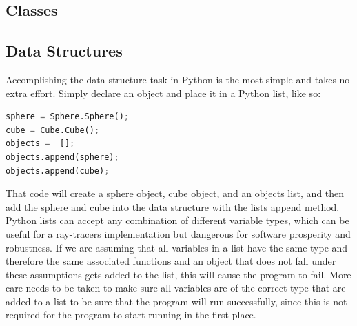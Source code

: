 \subsection{Classes}

\subsection{Data Structures}
Accomplishing the data structure task in Python is the most simple and takes no extra effort.  Simply declare an object and place it in a Python list, like so:
\begin{lstlisting}[language=Python, caption=Python List Example, style=mystyle]
sphere = Sphere.Sphere();
cube = Cube.Cube();
objects =  [];
objects.append(sphere);
objects.append(cube);
\end{lstlisting}
That code will create a sphere object, cube object, and an objects list, and then add the sphere and cube into the data structure with the lists append method.  Python lists can accept any combination of different variable types, which can be useful for a ray-tracers implementation but dangerous for software prosperity and robustness.  If we are assuming that all variables in a list have the same type and therefore the same associated functions and an object that does not fall under these assumptions gets added to the list, this will cause the program to fail.  More care needs to be taken to make sure all variables are of the correct type that are added to a list to be sure that the program will run successfully, since this is not required for the program to start running in the first place.

